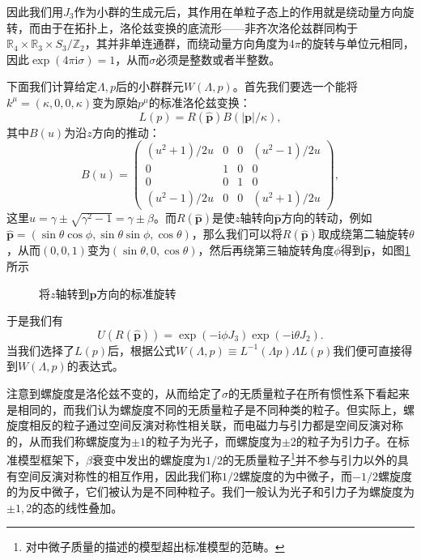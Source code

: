 因此我们用$ J_{3}$作为小群的生成元后，其作用在单粒子态上的作用就是绕动量方向旋转，而由于在拓扑上，洛伦兹变换的底流形——非齐次洛伦兹群同构于$ \mathbb{R}_{4} \times \mathbb{R}_{3} \times S_{3} /\mathbb{Z}_{2}$，其并非单连通群，而绕动量方向角度为$ 4\pi $的旋转与单位元相同，因此$ \exp( 4\pi \mathrm{i} \sigma ) =1$，从而$ \sigma $必须是整数或者半整数。

下面我们计算给定$ \Lambda ,p$后的小群群元$ W( \Lambda ,p)$。首先我们要选一个能将$ k^{\mu } =( \kappa ,0,0,\kappa )$变为原始$ p^{\mu }$的标准洛伦兹变换：
\begin{equation*}
	L( p) =R(\hat{\boldsymbol{p}}) B(| \boldsymbol{p}| /\kappa ) ,
\end{equation*}
其中$ B( u)$为沿$ z$方向的推动：
\begin{equation*}
	B( u) =\begin{pmatrix}
		(u^{2} +1)/2u & 0 & 0 & (u^{2} -1)/2u\\
		0 & 1 & 0 & 0\\
		0 & 0 & 1 & 0\\
		(u^{2} -1)/2u & 0 & 0 & (u^{2} +1)/2u
	\end{pmatrix} ,
\end{equation*}
这里$u=\gamma \pm \sqrt{\gamma ^{2} -1} =\gamma \pm \beta $。而$ R(\hat{\boldsymbol{p}})$是使$ z$轴转向$ \hat{\boldsymbol{p}}$方向的转动，例如$ \hat{\boldsymbol{p}} =(\sin \theta \cos \phi ,\sin \theta \sin \phi ,\cos \theta )$，那么我们可以将$ R(\hat{\boldsymbol{p}})$取成绕第二轴旋转$ \theta $，从而$ ( 0,0,1)$变为$ (\sin \theta ,0,\cos \theta )$，然后再绕第三轴旋转角度$ \phi $得到$ \hat{\boldsymbol{p}}$，如图\ref{fig:standard-rotation}所示

\begin{figure}
	\centering
	
	
	
	\caption{将$z$轴转到$\boldsymbol{p}$方向的标准旋转}
	
	\label{fig:standard-rotation}
\end{figure}

于是我们有
\begin{equation*}
	U( R(\hat{\boldsymbol{p}})) =\exp( -\mathrm{i} \phi J_{3})\exp( -\mathrm{i} \theta J_{2}) .
\end{equation*}
当我们选择了$ L( p)$后，根据公式$ W( \Lambda ,p) \equiv L^{-1}( \Lambda p) \Lambda L( p)$我们便可直接得到$ W( \Lambda ,p)$的表达式。

注意到螺旋度是洛伦兹不变的，从而给定了$ \sigma $的无质量粒子在所有惯性系下看起来是相同的，而我们认为螺旋度不同的无质量粒子是不同种类的粒子。但实际上，螺旋度相反的粒子通过空间反演对称性相关联，而电磁力与引力都是空间反演对称的，从而我们称螺旋度为$ \pm 1$的粒子为光子，而螺旋度为$ \pm 2$的粒子为引力子。在标准模型框架下，$ \beta $衰变中发出的螺旋度为$ 1/2$的无质量粒子\footnote{对中微子质量的描述的模型超出标准模型的范畴。}并不参与引力以外的具有空间反演对称性的相互作用，因此我们称$ 1/2$螺旋度的为中微子，而$ -1/2$螺旋度的为反中微子，它们被认为是不同种粒子。我们一般认为光子和引力子为螺旋度为$ \pm 1,2$的态的线性叠加。

